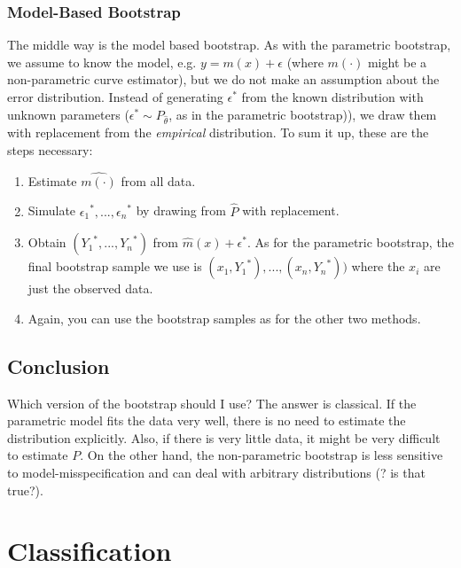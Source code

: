\documentclass[]{book}
\providecommand{\tightlist}{%
  \setlength{\itemsep}{0pt}\setlength{\parskip}{0pt}}
\begin{document}
\subsection{Model-Based Bootstrap}\label{model-based-bootstrap}

The middle way is the model based bootstrap. As with the parametric
bootstrap, we assume to know the model, e.g. \(y = m(x) + \epsilon\)
(where \(m(\cdot)\) might be a non-parametric curve estimator), but we
do not make an assumption about the error distribution. Instead of
generating \(\epsilon^*\) from the known distribution with unknown
parameters (\(\epsilon^* \sim P_{\hat{\theta}}\), as in the parametric
bootstrap)), we draw them with replacement from the \emph{empirical}
distribution. To sum it up, these are the steps necessary:

\begin{enumerate}
\def\labelenumi{\arabic{enumi}.}
\tightlist
\item
  Estimate \(\hat{m(\cdot)}\) from all data.
\item
  Simulate \({\epsilon_1}^*, ..., {\epsilon_n}^*\) by drawing from
  \(\hat{P}\) with replacement.
\item
  Obtain \(({Y_1}^*, ..., {Y_n}^*)\) from \(\hat{m}(x) + \epsilon^*\).
  As for the parametric bootstrap, the final bootstrap sample we use is
  \((x_1, {Y_1}^*), ..., (x_n, {Y_n}^*))\) where the \(x_i\) are just
  the observed data.
\item
  Again, you can use the bootstrap samples as for the other two methods.
\end{enumerate}

\section{Conclusion}\label{conclusion}

Which version of the bootstrap should I use? The answer is classical. If
the parametric model fits the data very well, there is no need to
estimate the distribution explicitly. Also, if there is very little
data, it might be very difficult to estimate \(P\). On the other hand,
the non-parametric bootstrap is less sensitive to model-misspecification
and can deal with arbitrary distributions (? is that true?).

\chapter{Classification}\label{classification}
\end{document}

